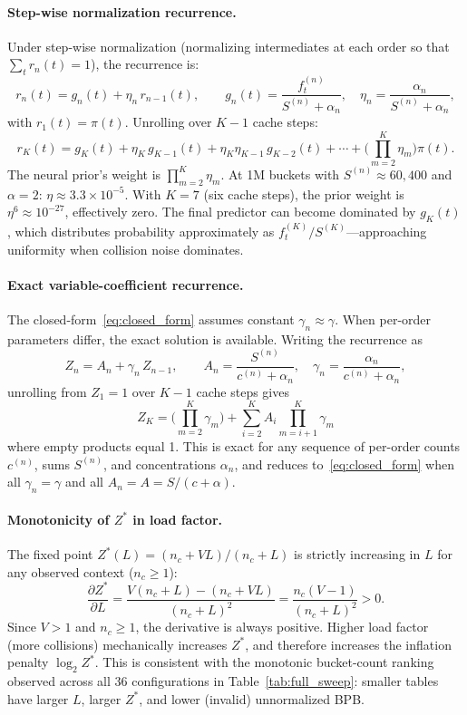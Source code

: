 \documentclass[11pt]{article}
\begin{document}
\paragraph{Step-wise normalization recurrence.}
Under step-wise normalization (normalizing intermediates at each order so that $\sum_t r_n(t) = 1$), the recurrence is:
\[
r_n(t) = g_n(t) + \eta_n \, r_{n-1}(t), \qquad g_n(t) = \frac{f_t^{(n)}}{S^{(n)} + \alpha_n}, \quad \eta_n = \frac{\alpha_n}{S^{(n)} + \alpha_n},
\]
with $r_1(t) = \pi(t)$. Unrolling over $K - 1$ cache steps:
\[
r_K(t) = g_K(t) + \eta_K \, g_{K-1}(t) + \eta_K \eta_{K-1} \, g_{K-2}(t) + \cdots + \Big(\prod_{m=2}^{K} \eta_m\Big) \pi(t).
\]
The neural prior's weight is $\prod_{m=2}^K \eta_m$. At 1M buckets with $S^{(n)} \approx 60{,}400$ and $\alpha = 2$: $\eta \approx 3.3 \times 10^{-5}$. With $K = 7$ (six cache steps), the prior weight is $\eta^6 \approx 10^{-27}$, effectively zero. The final predictor can become dominated by $g_K(t)$, which distributes probability approximately as $f_t^{(K)} / S^{(K)}$---approaching uniformity when collision noise dominates.

\paragraph{Exact variable-coefficient recurrence.}
The closed-form~\eqref{eq:closed_form} assumes constant $\gamma_n \approx \gamma$. When per-order parameters differ, the exact solution is available. Writing the recurrence as
\[
Z_n = A_n + \gamma_n \, Z_{n-1}, \qquad A_n = \frac{S^{(n)}}{c^{(n)} + \alpha_n},\quad \gamma_n = \frac{\alpha_n}{c^{(n)} + \alpha_n},
\]
unrolling from $Z_1 = 1$ over $K - 1$ cache steps gives
\begin{equation}
Z_K = \Bigg(\prod_{m=2}^{K} \gamma_m\Bigg) + \sum_{i=2}^{K} A_i \prod_{m=i+1}^{K} \gamma_m
\label{eq:exact_recurrence}
\end{equation}
where empty products equal 1. This is exact for any sequence of per-order counts $c^{(n)}$, sums $S^{(n)}$, and concentrations $\alpha_n$, and reduces to~\eqref{eq:closed_form} when all $\gamma_n = \gamma$ and all $A_n = A = S/(c + \alpha)$.

\paragraph{Monotonicity of $Z^*$ in load factor.}
The fixed point $Z^*(L) = (n_c + VL)/(n_c + L)$ is strictly increasing in $L$ for any observed context ($n_c \geq 1$):
\[
\frac{\partial Z^*}{\partial L} = \frac{V(n_c + L) - (n_c + VL)}{(n_c + L)^2} = \frac{n_c(V - 1)}{(n_c + L)^2} > 0.
\]
Since $V > 1$ and $n_c \geq 1$, the derivative is always positive. Higher load factor (more collisions) mechanically increases $Z^*$, and therefore increases the inflation penalty $\log_2 Z^*$. This is consistent with the monotonic bucket-count ranking observed across all 36 configurations in Table~\ref{tab:full_sweep}: smaller tables have larger $L$, larger $Z^*$, and lower (invalid) unnormalized BPB.
\end{document}
